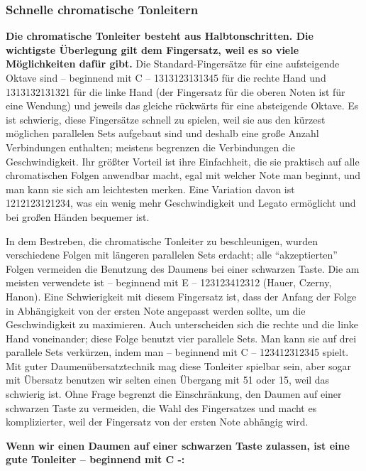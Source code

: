\subsubsection{Schnelle chromatische Tonleitern}
\label{c1iii5h}

\textbf{Die chromatische Tonleiter besteht aus Halbtonschritten.
Die wichtigste Überlegung gilt dem Fingersatz, weil es so viele Möglichkeiten dafür gibt.}
Die Standard-Fingersätze für eine aufsteigende Oktave sind -- beginnend mit C -- 1313123131345 für die rechte Hand und 1313132131321 für die linke Hand (der Fingersatz für die oberen Noten ist für eine Wendung) und jeweils das gleiche rückwärts für eine absteigende Oktave.
Es ist schwierig, diese Fingersätze schnell zu spielen, weil sie aus den kürzest möglichen parallelen Sets aufgebaut sind und deshalb eine große Anzahl Verbindungen enthalten; meistens begrenzen die Verbindungen die Geschwindigkeit. 
Ihr größter Vorteil ist ihre Einfachheit, die sie praktisch auf alle chromatischen Folgen anwendbar macht, egal mit welcher Note man beginnt, und man kann sie sich am leichtesten merken.
Eine Variation davon ist 1212123121234, was ein wenig mehr Geschwindigkeit und Legato ermöglicht und bei großen Händen bequemer ist.

In dem Bestreben, die chromatische Tonleiter zu beschleunigen, wurden verschiedene Folgen mit längeren parallelen Sets erdacht; alle \enquote{akzeptierten} Folgen vermeiden die Benutzung des Daumens bei einer schwarzen Taste.
Die am meisten verwendete ist -- beginnend mit E -- 123123412312 (Hauer, Czerny, Hanon).
Eine Schwierigkeit mit diesem Fingersatz ist, dass der Anfang der Folge in Abhängigkeit von der ersten Note angepasst werden sollte, um die Geschwindigkeit zu maximieren.
Auch unterscheiden sich die rechte und die linke Hand voneinander; diese Folge benutzt vier parallele Sets.
Man kann sie auf drei parallele Sets verkürzen, indem man -- beginnend mit C -- 123412312345 spielt.
Mit guter Daumenübersatztechnik mag diese Tonleiter spielbar sein, aber sogar mit Übersatz benutzen wir selten einen Übergang mit 51 oder 15, weil das schwierig ist.
Ohne Frage begrenzt die Einschränkung, den Daumen auf einer schwarzen Taste zu vermeiden, die Wahl des Fingersatzes und macht es komplizierter, weil der Fingersatz von der ersten Note abhängig wird.

\textbf{Wenn wir einen Daumen auf einer schwarzen Taste zulassen, ist eine gute Tonleiter -- beginnend mit C -:}

